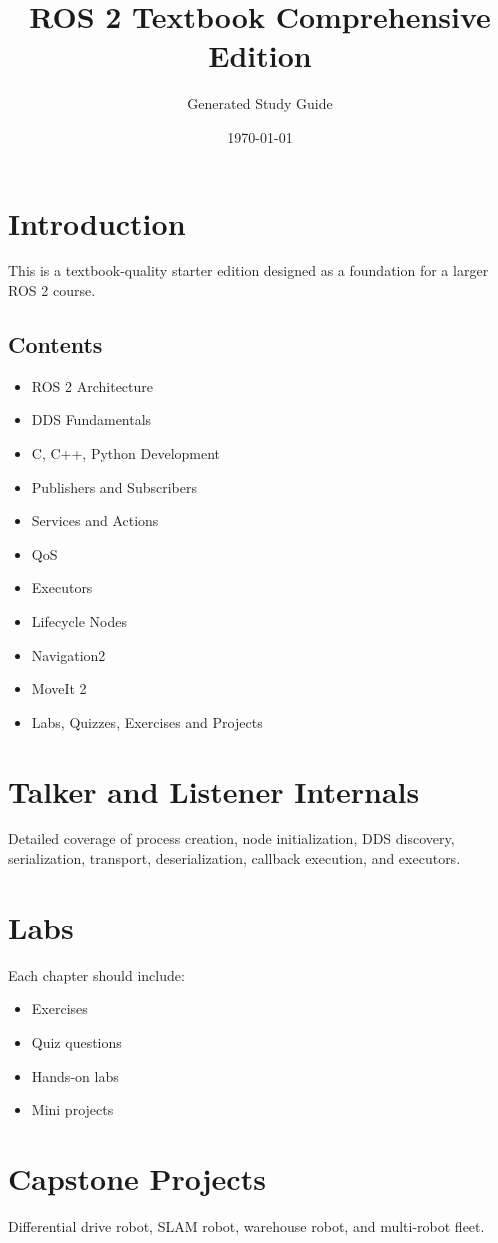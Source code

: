 \documentclass{book}
\title{ROS 2 Textbook Comprehensive Edition}
\author{Generated Study Guide}
\date{\today}
\begin{document}
\maketitle
\tableofcontents

\chapter{Introduction}
This is a textbook-quality starter edition designed as a foundation for a larger ROS 2 course.

\section{Contents}
\begin{itemize}
\item ROS 2 Architecture
\item DDS Fundamentals
\item C, C++, Python Development
\item Publishers and Subscribers
\item Services and Actions
\item QoS
\item Executors
\item Lifecycle Nodes
\item Navigation2
\item MoveIt 2
\item Labs, Quizzes, Exercises and Projects
\end{itemize}

\chapter{Talker and Listener Internals}
Detailed coverage of process creation, node initialization, DDS discovery,
serialization, transport, deserialization, callback execution, and executors.

\chapter{Labs}
Each chapter should include:
\begin{itemize}
\item Exercises
\item Quiz questions
\item Hands-on labs
\item Mini projects
\end{itemize}

\chapter{Capstone Projects}
Differential drive robot, SLAM robot, warehouse robot, and multi-robot fleet.
\end{document}

